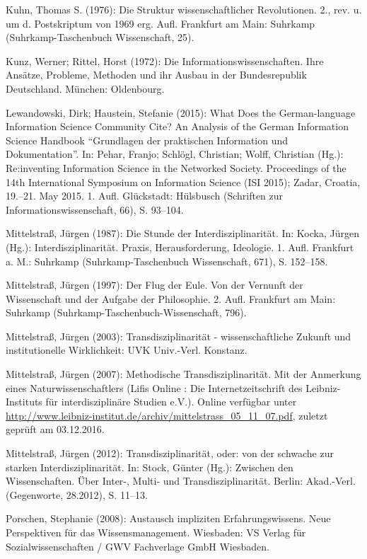 \documentclass[a4paper,
fontsize=11pt,
oneside,
numbers=noperiodatend,
parskip=half-,
bibliography=totoc,
final
]{scrartcl}
\begin{document}
Kuhn, Thomas S. (1976): Die Struktur wissenschaftlicher Revolutionen.
2., rev. u. um d. Postskriptum von 1969 erg. Aufl. Frankfurt am Main:
Suhrkamp (Suhrkamp-Taschenbuch Wissenschaft, 25).

Kunz, Werner; Rittel, Horst (1972): Die Informationswissenschaften. Ihre
Ansätze, Probleme, Methoden und ihr Ausbau in der Bundesrepublik
Deutschland. München: Oldenbourg.

Lewandowski, Dirk; Haustein, Stefanie (2015): What Does the
German-language Information Science Community Cite? An Analysis of the
German Information Science Handbook \enquote{Grundlagen der praktischen
Information und Dokumentation}. In: Pehar, Franjo; Schlögl, Christian;
Wolff, Christian (Hg.): Re:inventing Information Science in the
Networked Society. Proceedings of the 14th International Symposium on
Information Science (ISI 2015); Zadar, Croatia, 19.--21. May 2015. 1.
Aufl. Glückstadt: Hülsbusch (Schriften zur Informationswissenschaft,
66), S. 93--104.

Mittelstraß, Jürgen (1987): Die Stunde der Interdisziplinarität. In:
Kocka, Jürgen (Hg.): Interdisziplinarität. Praxis, Herausforderung,
Ideologie. 1. Aufl. Frankfurt a. M.: Suhrkamp (Suhrkamp-Taschenbuch
Wissenschaft, 671), S. 152--158.

Mittelstraß, Jürgen (1997): Der Flug der Eule. Von der Vernunft der
Wissenschaft und der Aufgabe der Philosophie. 2. Aufl. Frankfurt am
Main: Suhrkamp (Suhrkamp-Taschenbuch-Wissenschaft, 796).

Mittelstraß, Jürgen (2003): Transdisziplinarität - wissenschaftliche
Zukunft und institutionelle Wirklichkeit: UVK Univ.-Verl. Konstanz.

Mittelstraß, Jürgen (2007): Methodische Transdisziplinarität. Mit der
Anmerkung eines Naturwissenschaftlers (Lifis Online : Die
Internetzeitschrift des Leibniz-Instituts für interdisziplinäre Studien
e.V.). Online verfügbar unter
\url{http://www.leibniz-institut.de/archiv/mittelstrass_05_11_07.pdf},
zuletzt geprüft am 03.12.2016.

Mittelstraß, Jürgen (2012): Transdisziplinarität, oder: von der schwache
zur starken Interdisziplinarität. In: Stock, Günter (Hg.): Zwischen den
Wissenschaften. Über Inter-, Multi- und Transdisziplinarität. Berlin:
Akad.-Verl. (Gegenworte, 28.2012), S. 11--13.

Porschen, Stephanie (2008): Austausch impliziten Erfahrungswissens. Neue
Perspektiven für das Wissensmanagement. Wiesbaden: VS Verlag für
Sozialwissenschaften / GWV Fachverlage GmbH Wiesbaden.
\end{document}
